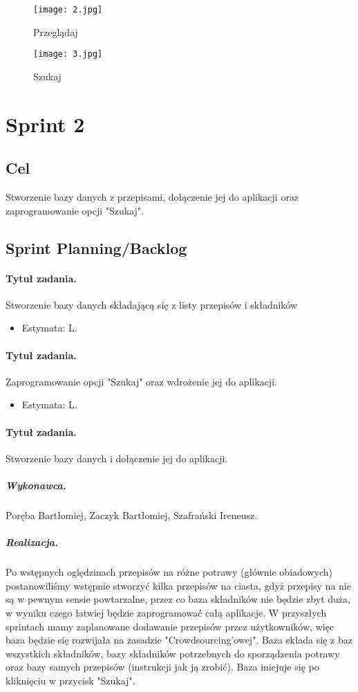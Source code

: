 \documentclass[a4paper]{article}
\begin{document}
	\begin{figure}
		\centering
		\texttt{[image: 2.jpg]}
		\caption{Przeglądaj}
		\label{przegladaj}
	\end{figure}

	\begin{figure}
		\centering
		\texttt{[image: 3.jpg]}
		\caption{Szukaj}
		\label{Szukaj}
	\end{figure}
	
	\section{Sprint 2}
	
	\subsection{Cel} Stworzenie bazy danych z przepisami, dołączenie jej do aplikacji oraz zaprogramowanie opcji "Szukaj".
	
	\subsection{Sprint Planning/Backlog}
	
	\paragraph{Tytuł zadania.} Stworzenie bazy danych składającą się z listy przepisów i składników
	\begin{itemize}
		\item Estymata: L.
	\end{itemize}
	
	\paragraph{Tytuł zadania.} Zaprogramowanie opcji "Szukaj" oraz wdrożenie jej do aplikacji.
	\begin{itemize}
		\item Estymata: L.
	\end{itemize}
	
	\paragraph{Tytuł zadania.} Stworzenie bazy danych i dołączenie jej do aplikacji.
	\subparagraph{Wykonawca.} Poręba Bartłomiej, Zaczyk Bartłomiej, Szafrański Ireneusz.
	\subparagraph{Realizacja.} 
	Po wstępnych oględzinach przepisów na różne potrawy (głównie obiadowych) postanowiliśmy wstępnie stworzyć kilka przepisów na ciasta, gdyż przepisy na nie są w pewnym sensie powtarzalne, przez co baza składników nie będzie zbyt duża, w wyniku czego łatwiej będzie zaprogramować całą aplikacje. W przyszłych sprintach mamy zaplanowane dodawanie przepisów przez użytkowników, więc baza będzie się rozwijała na zasadzie "Crowdsourcing'owej". Baza składa się z baz wszystkich składników, bazy składników potrzebnych do sporządzenia potrawy oraz bazy samych przepisów (instrukcji jak ją zrobić). Baza inicjuje się po kliknięciu w przycisk "Szukaj".
	
\end{document}
